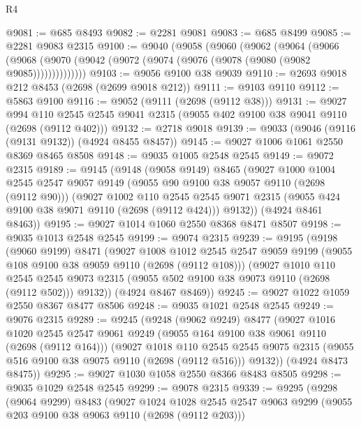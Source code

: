 \begin{lexlean}{R4}
\begin{coremodule}
@9081 := @685 @8493
@9082 := @2281 @9081
@9083 := @685 @8499
@9085 := @2281 @9083 @2315
@9100 := @9040
    (@9058
      (@9060
        (@9062
          (@9064
            (@9066
              (@9068 (@9070 (@9042 (@9072 (@9074 (@9076 (@9078 (@9080 (@9082 @9085))))))))))))))
@9103 := @9056 @9100 @38 @9039
@9110 := @2693 @9018 @212 @8453 (@2698 (@2699 @9018 @212))
@9111 := @9103 @9110
@9112 := @5863 @9100
@9116 := @9052 (@9111 (@2698 (@9112 @38)))
@9131 := @9027
    @994
    @110
    @2545
    @2545
    @9041
    @2315
    (@9055 @402 @9100 @38 @9041 @9110 (@2698 (@9112 @402)))
@9132 := @2718 @9018
@9139 := @9033 (@9046 (@9116 (@9131 @9132)) (@4924 @8455 @8457))
@9145 := @9027 @1006 @1061 @2550 @8369 @8465 @8508
@9148 := @9035 @1005 @2548 @2545
@9149 := @9072 @2315
@9189 := @9145
    (@9148
      (@9058 @9149)
      @8465
      (@9027
        @1000
        @1004
        @2545
        @2547
        @9057
        @9149
        (@9055 @90 @9100 @38 @9057 @9110 (@2698 (@9112 @90)))
        (@9027
          @1002
          @110
          @2545
          @2545
          @9071
          @2315
          (@9055 @424 @9100 @38 @9071 @9110 (@2698 (@9112 @424)))
          @9132))
      (@4924 @8461 @8463))
@9195 := @9027 @1014 @1060 @2550 @8368 @8471 @8507
@9198 := @9035 @1013 @2548 @2545
@9199 := @9074 @2315
@9239 := @9195
    (@9198
      (@9060 @9199)
      @8471
      (@9027
        @1008
        @1012
        @2545
        @2547
        @9059
        @9199
        (@9055 @108 @9100 @38 @9059 @9110 (@2698 (@9112 @108)))
        (@9027
          @1010
          @110
          @2545
          @2545
          @9073
          @2315
          (@9055 @502 @9100 @38 @9073 @9110 (@2698 (@9112 @502)))
          @9132))
      (@4924 @8467 @8469))
@9245 := @9027 @1022 @1059 @2550 @8367 @8477 @8506
@9248 := @9035 @1021 @2548 @2545
@9249 := @9076 @2315
@9289 := @9245
    (@9248
      (@9062 @9249)
      @8477
      (@9027
        @1016
        @1020
        @2545
        @2547
        @9061
        @9249
        (@9055 @164 @9100 @38 @9061 @9110 (@2698 (@9112 @164)))
        (@9027
          @1018
          @110
          @2545
          @2545
          @9075
          @2315
          (@9055 @516 @9100 @38 @9075 @9110 (@2698 (@9112 @516)))
          @9132))
      (@4924 @8473 @8475))
@9295 := @9027 @1030 @1058 @2550 @8366 @8483 @8505
@9298 := @9035 @1029 @2548 @2545
@9299 := @9078 @2315
@9339 := @9295
    (@9298
      (@9064 @9299)
      @8483
      (@9027
        @1024
        @1028
        @2545
        @2547
        @9063
        @9299
        (@9055 @203 @9100 @38 @9063 @9110 (@2698 (@9112 @203)))

\end{coremodule}
\end{lexlean}
